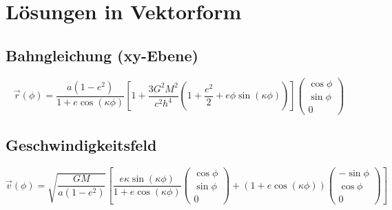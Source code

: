 \section{Lösungen in Vektorform}
\subsection{Bahngleichung (xy-Ebene)}
\[
\vec{r}(\phi) = \frac{a(1-e^2)}{1+e\cos(\kappa\phi)} \left[1 + \frac{3G^2M^2}{c^2h^4}\left(1+\frac{e^2}{2}+e\phi\sin(\kappa\phi)\right)\right] \begin{pmatrix} \cos\phi \\ \sin\phi \\ 0 \end{pmatrix}
\]

\subsection{Geschwindigkeitsfeld}
\[
\vec{v}(\phi) = \sqrt{\frac{GM}{a(1-e^2)}} \left[
\frac{e\kappa\sin(\kappa\phi)}{1+e\cos(\kappa\phi)} \begin{pmatrix} \cos\phi \\ \sin\phi \\ 0 \end{pmatrix} + 
(1+e\cos(\kappa\phi)) \begin{pmatrix} -\sin\phi \\ \cos\phi \\ 0 \end{pmatrix}
\right]
\]